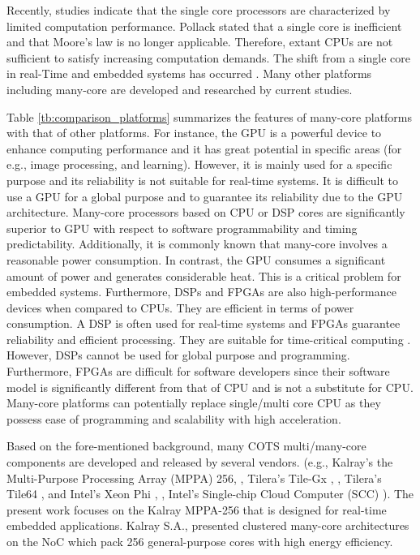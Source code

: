 \documentclass[conference,compsoc]{IEEEtran}
\begin{document}
Recently, studies indicate that the single core processors are characterized by limited computation performance.
Pollack stated that a single core is inefficient \cite{pollack1999new} and that Moore's law \cite{moore2006cramming} is no longer applicable. 
Therefore, extant CPUs are not sufficient to satisfy increasing computation demands.
The shift from a single core in real-Time and embedded systems has occurred \cite{saidi2015shift}. 
Many other platforms including many-core are developed and researched by current studies.

Table \ref{tb:comparison_platforms} summarizes the features of many-core platforms with that of other platforms.
For instance, the GPU is a powerful device to enhance computing performance and it has great potential in specific areas (for e.g., image processing, and learning).
However, it is mainly used for a specific purpose and its reliability is not suitable for real-time systems.
It is difficult to use a GPU for a global purpose and to guarantee its reliability due to the GPU architecture.
Many-core processors based on CPU or DSP cores are significantly superior to GPU with respect to software programmability and timing predictability.
Additionally, it is commonly known that many-core involves a reasonable power consumption.
In contrast, the GPU consumes a significant amount of power and generates considerable heat.
This is a critical problem for embedded systems.
Furthermore, DSPs and FPGAs are also high-performance devices when compared to CPUs.
They are efficient in terms of power consumption.
A DSP is often used for real-time systems and FPGAs guarantee reliability and efficient processing.
They are suitable for time-critical computing \cite{de2015kalray}.
However, DSPs cannot be used for global purpose and programming.
Furthermore, FPGAs are difficult for software developers since their software model is significantly different from that of CPU and is not a substitute for CPU.
Many-core platforms can potentially replace single/multi core CPU as they possess ease of programming and scalability with high acceleration.

Based on the fore-mentioned background, many COTS multi/many-core components are developed and released by several vendors.
(e.g., Kalray's the Multi-Purpose Processing Array (MPPA) 256, \cite{de2014time}, Tilera's Tile-Gx \cite{schooler2010tile}, \cite{ramey2011tile}, Tilera's Tile64 \cite{bell2008tile64}, and Intel's Xeon Phi \cite{chrysos2014intel}, \cite{chrysos2012intel}, Intel's Single-chip Cloud Computer (SCC) \cite{baron2010single}).
The present work focuses on the Kalray MPPA-256 that is designed for real-time embedded applications.
Kalray S.A., \cite{de2014time} presented clustered many-core architectures on the NoC which pack 256 general-purpose cores with high energy efficiency.
\end{document}
